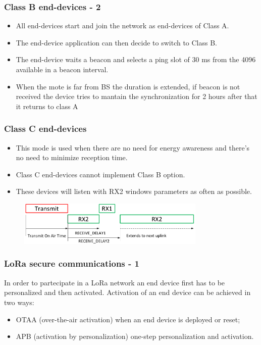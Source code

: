 \begin{frame}[fragile]
  \frametitle{Class B end-devices - 2}
  \begin{itemize}
		\item All end-devices start and join the network as end-devices of Class A.
		\item The end-device application can then decide to switch to Class B.
		\item The end-device waits a beacon and selects a ping slot of 30 ms from the 4096 available in a beacon interval.
		\item When the mote is far from BS the duration is extended, if beacon is not received the device tries to mantain the synchronization for 2 hours after that it returns to class A
  \end{itemize}
\end{frame}

\begin{frame}[fragile]
	\frametitle{Class C end-devices}
	\begin{itemize}
		\item This mode is used when there are no need for energy awareness and there's no need to minimize reception time.
		\item Class C end-devices cannot implement Class B option.
		\item These devices will listen with RX2 windows parameters as often as possible.
	\end{itemize}
	\begin{figure}
		\centering
		\includegraphics[width=0.8\textwidth]{img/loraClassC.png}
	\end{figure}
\end{frame}


\begin{frame}[fragile]
  \frametitle{LoRa secure communications - 1}
  In order to partecipate in a LoRa network an end device first has to be personalized and then activated.
  Activation of an end device can be achieved in two ways:
  \begin{itemize}
    \item OTAA (over-the-air activation) when an end device is deployed or reset;
    \item APB (activation by personalization) one-step personalization and activation.
  \end{itemize}
\end{frame}

